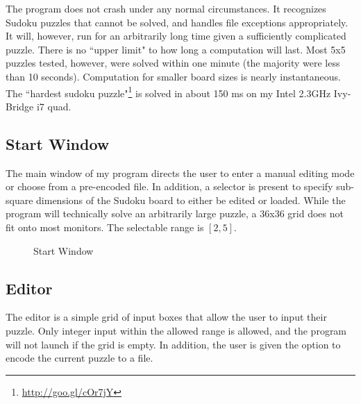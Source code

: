 \documentclass{article}
\begin{document}
The program does not crash under any normal circumstances. It recognizes Sudoku puzzles that cannot be solved, and handles file exceptions appropriately. It will, however, run for an arbitrarily long time given a sufficiently complicated puzzle. There is no ``upper limit" to how long a computation will last. Most 5x5 puzzles tested, however, were solved within one minute (the majority were less than 10 seconds). Computation for smaller board sizes is nearly instantaneous. The ``hardest sudoku puzzle"\footnote{\url{http://goo.gl/cOr7jY}} is solved in about 150 ms on my Intel 2.3GHz Ivy-Bridge i7 quad.

\subsection*{Start Window}
The main window of my program directs the user to enter a manual editing mode or choose from a pre-encoded file. In addition, a selector is present to specify sub-square dimensions of the Sudoku board to either be edited or loaded. While the program will technically solve an arbitrarily large puzzle, a 36x36 grid does not fit onto most monitors. The selectable range is $[2,5]$.

\begin{figure}[h!]
\begin{center}
	\caption{Start Window}
\end{center}
\end{figure}

\subsection*{Editor}

The editor is a simple grid of input boxes that allow the user to input their puzzle. Only integer input within the allowed range is allowed, and the program will not launch if the grid is empty. In addition, the user is given the option to encode the current puzzle to a file.
\end{document}
